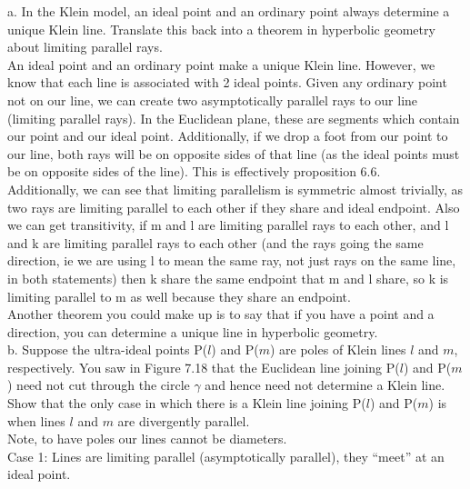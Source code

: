 \documentclass[12pt,letterpaper]{article}
\newcommand{\prob}[1]{\newpage\noindent {\bf #1}}
\begin{document}
\prob{Chapter 7: K3 }

a. In the Klein model, an ideal point and an ordinary point always determine a unique Klein line. Translate this back into a theorem in hyperbolic geometry about limiting parallel rays.\\

An ideal point and an ordinary point make a unique Klein line.  However, we know that each line is associated with 2 ideal points.  Given any ordinary point not on our line, we can create two asymptotically parallel rays to our line (limiting parallel rays).  In the Euclidean plane, these are segments which contain our point and our ideal point.  Additionally, if we drop a foot from our point to our line, both rays will be on opposite sides of that line (as the ideal points must be on opposite sides of the line).  This is effectively proposition 6.6.\\

Additionally, we can see that limiting parallelism is symmetric almost trivially, as two rays are limiting parallel to each other if they share and ideal endpoint.  Also we can get transitivity, if m and l are limiting parallel rays to each other, and l and k are limiting parallel rays to each other (and the rays going the same direction, ie we are using l to mean the same ray, not just rays on the same line, in both statements) then k share the same endpoint that m and l share, so k is limiting parallel to m as well because they share an endpoint. \\

Another theorem you could make up is to say that if you have a point and a direction, you can determine a unique line in hyperbolic geometry. \\


\newpage 
b. Suppose the ultra-ideal points P($l$) and P($m$) are poles of Klein lines $l$ and $m$, respectively. You saw in Figure 7.18 that the Euclidean line joining P($l$) and P($m$) need not cut through the circle $\gamma$ and hence need not determine a Klein line. Show that the only case in which there is a Klein line joining P($l$) and P($m$) is when lines $l$ and $m$ are divergently parallel. \\


Note, to have poles our lines cannot be diameters.\\

Case 1: Lines are limiting parallel (asymptotically parallel), they ``meet'' at an ideal point.\\
\end{document}
